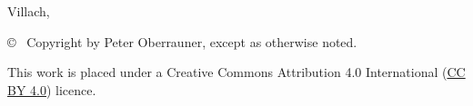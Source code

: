 \begin{center}
    \vspace{1cm}

    {\normalsize\sffamily Villach, \thisdate}



    \vfill

    {\footnotesize\sffamily \copyright ~ Copyright \thisyear{} by Peter Oberrauner,
        except as otherwise noted.}

    {\footnotesize\sffamily This work is placed under a
        Creative Commons Attribution 4.0 International
        (\href{https://creativecommons.org/licenses/by/4.0/}{CC BY 4.0}) licence.}


\end{center}






\cleardoublepage

